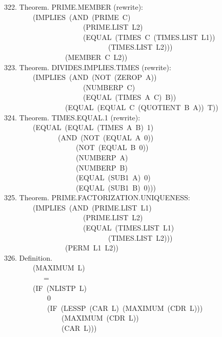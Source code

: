 \documentclass[10pt]{book}
\newenvironment{pubasis}{\begin{flushleft}}{\end{flushleft}}
\begin{document}
\begin{pubasis}
322.    Theorem.  PRIME.MEMBER (rewrite):\\
~~~~~~~~(IMPLIES~(AND~(PRIME~C)\\
~~~~~~~~~~~~~~~~~~~~~~(PRIME.LIST~L2)\\
~~~~~~~~~~~~~~~~~~~~~~(EQUAL~(TIMES~C~(TIMES.LIST~L1))\\
~~~~~~~~~~~~~~~~~~~~~~~~~~~~~(TIMES.LIST~L2)))\\
~~~~~~~~~~~~~~~~~(MEMBER~C~L2))\\

323.    Theorem.  DIVIDES.IMPLIES.TIMES (rewrite):\\
~~~~~~~~(IMPLIES~(AND~(NOT~(ZEROP~A))\\
~~~~~~~~~~~~~~~~~~~~~~(NUMBERP~C)\\
~~~~~~~~~~~~~~~~~~~~~~(EQUAL~(TIMES~A~C)~B))\\
~~~~~~~~~~~~~~~~~(EQUAL~(EQUAL~C~(QUOTIENT~B~A))~T))\\

324.    Theorem.  TIMES.EQUAL.1 (rewrite):\\
~~~~~~~~(EQUAL~(EQUAL~(TIMES~A~B)~1)\\
~~~~~~~~~~~~~~~(AND~(NOT~(EQUAL~A~0))\\
~~~~~~~~~~~~~~~~~~~~(NOT~(EQUAL~B~0))\\
~~~~~~~~~~~~~~~~~~~~(NUMBERP~A)\\
~~~~~~~~~~~~~~~~~~~~(NUMBERP~B)\\
~~~~~~~~~~~~~~~~~~~~(EQUAL~(SUB1~A)~0)\\
~~~~~~~~~~~~~~~~~~~~(EQUAL~(SUB1~B)~0)))\\

325.    Theorem.  PRIME.FACTORIZATION.UNIQUENESS:\\
~~~~~~~~(IMPLIES~(AND~(PRIME.LIST~L1)\\
~~~~~~~~~~~~~~~~~~~~~~(PRIME.LIST~L2)\\
~~~~~~~~~~~~~~~~~~~~~~(EQUAL~(TIMES.LIST~L1)\\
~~~~~~~~~~~~~~~~~~~~~~~~~~~~~(TIMES.LIST~L2)))\\
~~~~~~~~~~~~~~~~~(PERM~L1~L2))\\

326.    Definition.\\
~~~~~~~~(MAXIMUM~L)\\
~~~~~~~~~~~=\\
~~~~~~~~(IF~(NLISTP~L)\\
~~~~~~~~~~~~0\\
~~~~~~~~~~~~(IF~(LESSP~(CAR~L)~(MAXIMUM~(CDR~L)))\\
~~~~~~~~~~~~~~~~(MAXIMUM~(CDR~L))\\
~~~~~~~~~~~~~~~~(CAR~L)))\\


\end{pubasis}
\end{document}
